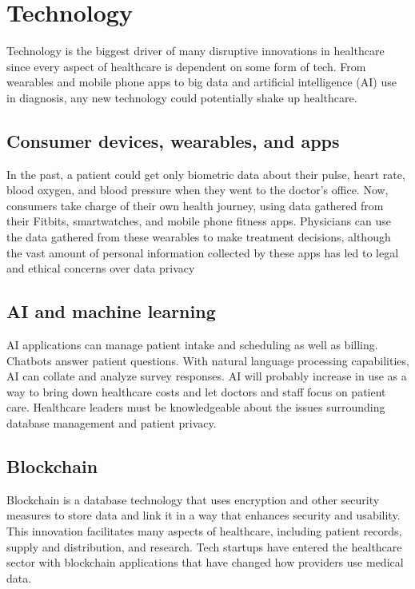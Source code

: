 \documentclass[12pt]{article}
\begin{document}
\section*{Technology}
Technology is the biggest driver of many disruptive innovations in healthcare since every aspect of healthcare is dependent on some form of tech. From wearables and mobile phone apps to big data and artificial intelligence (AI) use in diagnosis, any new technology could potentially shake up healthcare.




\subsection*{Consumer devices, wearables, and apps}
In the past, a patient could get only biometric data about their pulse, heart rate, blood oxygen, and blood pressure when they went to the doctor’s office. Now, consumers take charge of their own health journey, using data gathered from their Fitbits, smartwatches, and mobile phone fitness apps. Physicians can use the data gathered from these wearables to make treatment decisions, although the vast amount of personal information collected by these apps has led to legal and ethical concerns over data privacy


\subsection*{ AI and machine learning}
AI applications can manage patient intake and scheduling as well as billing. Chatbots answer patient questions. With natural language processing capabilities, AI can collate and analyze survey responses. AI will probably increase in use as a way to bring down healthcare costs and let doctors and staff focus on patient care. Healthcare leaders must be knowledgeable about the issues surrounding database management and patient privacy. 

\subsection*{Blockchain}
Blockchain is a database technology that uses encryption and other security measures to store data and link it in a way that enhances security and usability. This innovation facilitates many aspects of healthcare, including patient records, supply and distribution, and research. Tech startups have entered the healthcare sector with blockchain applications that have changed how providers use medical data.
\end{document}
